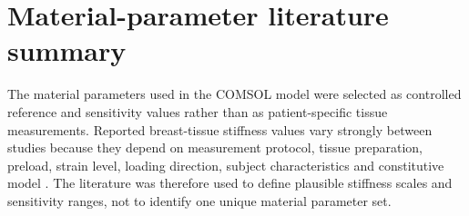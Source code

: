 \newpage
\section{Material-parameter literature summary}
\label{appendix_material_parameter_literature_summary}

The material parameters used in the COMSOL model were selected as controlled reference and sensitivity values rather than as patient-specific tissue measurements. Reported breast-tissue stiffness values vary strongly between studies because they depend on measurement protocol, tissue preparation, preload, strain level, loading direction, subject characteristics and constitutive model \cite{Samani2007,Ramiao2016,Goodbrake2022,Teixeira2023}. The literature was therefore used to define plausible stiffness scales and sensitivity ranges, not to identify one unique material parameter set.

